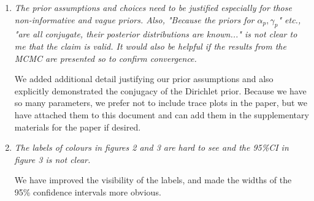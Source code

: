 \documentclass{article}
\begin{document}
\begin{enumerate}
\item\textit{The prior assumptions and choices need to be justified especially for those non-informative and vague priors. Also, "Because the priors for $\alpha_p, \gamma_p$" etc., "are all conjugate, their posterior distributions are known..." is not clear to me that the claim is valid. It would also be helpful if the results from the MCMC are presented so to confirm convergence.}

We added additional detail justifying our prior assumptions and also explicitly demonstrated the conjugacy of the Dirichlet prior. Because we have so many parameters, we prefer not to include trace plots in the paper, but we have attached them to this document and can add them in the supplementary materials for the paper if desired. 

\item\textit{The labels of colours in figures 2 and 3 are hard to see and the 95\%CI in figure 3 is not clear.}

We have improved the visibility of the labels, and made the widths of the 95\% confidence intervals more obvious. 
\end{enumerate}
\end{document}
